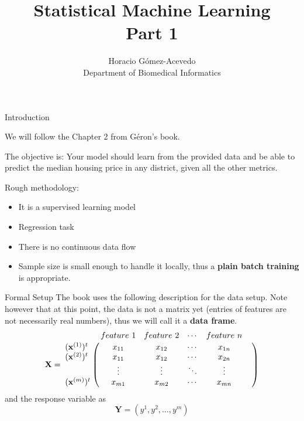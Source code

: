 \documentclass{beamer}
\title{Statistical Machine Learning\\ Part 1}
\author{Horacio G\'omez-Acevedo\\ Department of Biomedical Informatics}
\begin{document}
\begin{frame}[plain]
    \maketitle
\end{frame}
\begin{frame}{Introduction}
	
	We will follow the Chapter 2 from G\'eron's book. 
	
	The objective is:  Your model should learn from the provided data and be able to predict the median housing price in any district, given all the other metrics. 
	
	Rough methodology:
	\begin{itemize}
		\item It is a supervised learning model 
		\item Regression task 
		\item There is no continuous data flow 
		\item Sample size is small enough to handle it locally, thus a {\bf plain batch training} is appropriate.
	\end{itemize}
	
\end{frame}

\begin{frame}{Formal Setup}
	The book uses the following description for the data setup. Note however that at this point, the data is not a matrix yet (entries of features are not necessarily real numbers), thus we will call it a {\bf data frame}.
\begin{equation*}
	\mathbf{X}=
\bordermatrix{~ & feature\ 1 & feature\ 2 & \cdots & feature\ n   \cr
	(\mathbf{x}^{(1)} )^t& x_{11} & x_{12} & \cdots & x_{1n}   \cr
	(\mathbf{x}^{(2)} )^t& x_{11} & x_{12} & \cdots & x_{2n}   \cr
			 & \vdots & \vdots & \ddots & \vdots &  \cr
	(\mathbf{x}^{(m)} )^t & x_{m1} & x_{m2} & \cdots & x_{mn}  \cr} 
	\end{equation*}
and the response variable as 
$$
\mathbf{Y}=  (y^1, y^2, \ldots , y^m)
$$


\end{frame}
\end{document}
